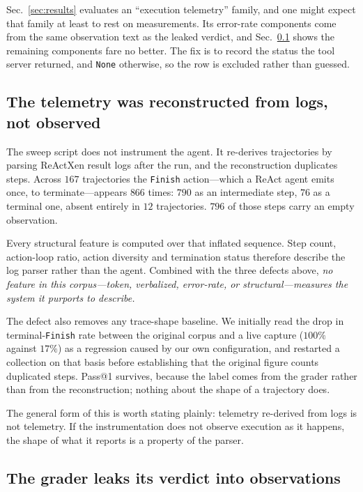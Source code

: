 \documentclass[conference]{IEEEtran}
\begin{document}
Sec.~\ref{sec:results} evaluates an ``execution telemetry'' family, and one
might expect that family at least to rest on measurements. Its error-rate
components come from the same observation text as the leaked verdict, and
Sec.~\ref{sec:recon} shows the remaining components fare no better. The fix is
to record the status the tool server returned, and \texttt{None} otherwise, so
the row is excluded rather than guessed.

\subsection{The telemetry was reconstructed from logs, not observed}
\label{sec:recon}

The sweep script does not instrument the agent. It re-derives trajectories by
parsing ReActXen result logs after the run, and the reconstruction duplicates
steps. Across $167$ trajectories the \texttt{Finish} action---which a ReAct agent
emits once, to terminate---appears $866$ times: $790$ as an intermediate step,
$76$ as a terminal one, absent entirely in $12$ trajectories. $796$ of those
steps carry an empty observation.

Every structural feature is computed over that inflated sequence. Step count,
action-loop ratio, action diversity and termination status therefore describe the
log parser rather than the agent. Combined with the three defects above,
\emph{no feature in this corpus---token, verbalized, error-rate, or
structural---measures the system it purports to describe.}

The defect also removes any trace-shape baseline. We initially read the drop in
terminal-\texttt{Finish} rate between the original corpus and a live capture
($100\%$ against $17\%$) as a regression caused by our own configuration, and
restarted a collection on that basis before establishing that the original figure
counts duplicated steps. Pass@1 survives, because the label comes from the grader
rather than from the reconstruction; nothing about the shape of a trajectory
does.

The general form of this is worth stating plainly: telemetry re-derived from logs
is not telemetry. If the instrumentation does not observe execution as it
happens, the shape of what it reports is a property of the parser.

\subsection{The grader leaks its verdict into observations}
\label{sec:leak}
\end{document}
